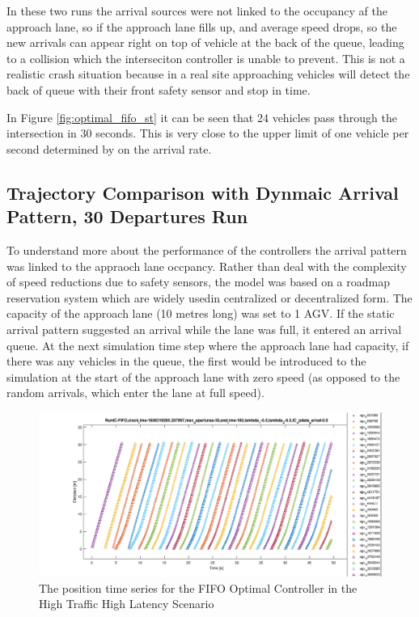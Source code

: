 \documentclass[]{article}
\begin{document}
In these two runs the arrival sources were not linked to the occupancy af the approach lane, so if the approach lane fills up, and average speed drops, so the new arrivals can appear right on top of vehicle at the back of the queue, leading to a collision which the interseciton controller is unable to prevent.  This is not a realistic crash situation because in a real site approaching vehicles will detect the back of queue with their front safety sensor and stop in time. 

In Figure \ref{fig:optimal_fifo_st} it can be seen that 24 vehicles pass through the intersection in 30 seconds. This is very close to the upper limit of one vehicle per second determined by on the arrival rate. 

\subsection{Trajectory Comparison with Dynmaic Arrival Pattern, 30 Departures Run}
\label{sec:mutex_arrival_pattern}
To understand more about the performance of the controllers the arrival pattern was linked to the appraoch lane occpancy. Rather than deal with the complexity of speed reductions due to safety sensors, the model was based on a roadmap reservation system which are widely usedin centralized or decentralized form. The capacity of the approach lane (10 metres long) was set to 1 AGV. If the static arrival pattern suggested an arrival while the lane was full, it entered an arrival queue. At the next simulation time step where the approach lane had capacity, if there was any vehicles in the queue, the first would be introduced to the simulation at the start of the approach lane with zero speed (as opposed to the random arrivals, which enter the lane at full speed).  
\begin{figure}
	\includegraphics[width=1.0\linewidth]{distance-time-FIFO-HighLatency-HighTraffic.eps}
	\caption{The position time series for the FIFO Optimal Controller in the High Traffic High Latency Scenario}
	\label{fig:optimal_fifo_st_HL_HT}       %
\end{figure}
\end{document}

